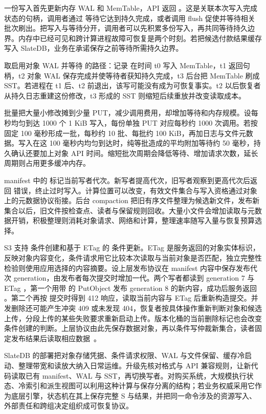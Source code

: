 一份写入首先更新内存 WAL 和 MemTable，API 返回 。这是关联本次写入完成状态的句柄，调用者通过 \mbox{} 等待它达到持久完成，或者调用 flush 促使并等待相关批次刷出。把写入与等待分开，调用者可以先积累多份写入，再共同等待持久边界。内存中已经可见和跨计算进程故障可恢复是两个时刻。若把候选付款结果缓存写入 SlateDB，业务在承诺保存之前等待所需持久边界。

取启用对象 WAL 并等待 \mbox{} 的路径：记录  在时间 t0 写入 MemTable，t1 返回句柄，t2 对象 WAL 保存完成并使等待者获知持久完成，t3 后台把 MemTable 刷成 SST。若进程在 t1 后、t2 前退出，该写可能没有成为可恢复事实。t2 以后恢复者从持久日志重建这份修改，t3 形成的 SST 则缩短后续重放并改变读取成本。

批量把大量小修改摊到少量 PUT，减少调用费用，却增加等待和内存规模。设每秒均匀到达 1000 个 1 KiB 写入，每份单独 PUT 对应每秒约 1000 次调用。若按固定 100 毫秒形成一批，每秒约 10 批、每批约 100 KiB，再加日志与文件元数据。写入在这 100 毫秒内均匀到达时，纯等批造成的平均附加等待约 50 毫秒，持久确认还要加上对象 API 时间。缩短批次周期会降低等待、增加请求次数，延长周期则占用更多缓冲内存。

manifest 中的  标记当前写者代次。新写者提高代次，旧写者观察到更高代次后返回  错误，终止过时写入。计算位置可以改变，有效文件集合与写入资格通过对象上的元数据协议衔接。后台 compaction 把旧有序文件整理为候选新文件，发布新集合以后，旧文件按检查点、读者与保留规则回收。大量小文件会增加读取与元数据开销，积极整理则消耗对象请求、网络和计算，整理速率随写入量与恢复预算选择。

S3 支持  条件创建和基于 ETag 的  条件更新。ETag 是服务返回的对象实体标识，反映对象内容变化，条件请求用它比较本次读取与当前对象是否匹配，独立完整性检验则使用应用选择的内容摘要。设上层发布协议在 manifest 内容中保存发布代次 generation，由发布者每次提交时增加一代。两个写者都读到 generation 7 与 ETag ，第一个用带  的 PutObject 发布 generation 8 的新内容，成功后服务返回 。第二个再按  提交时得到 412 响应，读取当前内容与 ETag 后重新构造提交。并发删除还可能产生冲突 409 或未发现 404，恢复者按具体操作重新判断对象和候选上传，分段上传的某些失败要求重新启动上传。版本化桶的当前删除标记也会改变条件创建的判断。上层协议由此先保存数据对象，再以条件写仲裁新集合，读者固定发布结果后读取相应数据~\cite{ch21-s3-conditions}。

SlateDB 的部署把对象存储凭据、条件请求权限、WAL 与文件保留、缓存冷启动、整理带宽和读放大纳入日常运维。升级先核对格式与 API 兼容规则，让新代码读取已有 manifest、WAL 与 SST，再切换写者。对购买系统，大规模执行状态、冷索引和派生视图可以利用这种计算与保存分离的结构；若业务权威采用它作为底层引擎，状态机在其上保存完整 S 与结果，并把同一命令涉及的资源写入、外部责任和跨组决定组织成可恢复协议。

